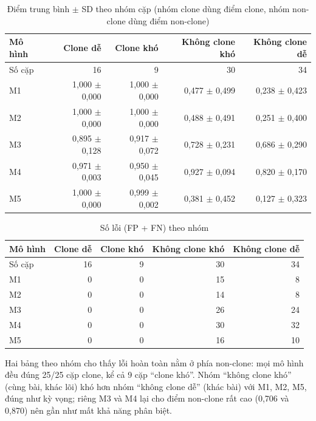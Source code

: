 \documentclass[11pt,a4paper]{article}
\begin{document}
\begin{table}[htbp]\centering\small
\caption{Điểm trung bình $\pm$ SD theo nhóm cặp (nhóm clone dùng điểm clone,
nhóm non-clone dùng điểm non-clone)}\label{tab:suite-cat-score}
\setlength{\tabcolsep}{4pt}
\begin{tabular}{lrrrr}
\toprule
Mô hình & Clone dễ & Clone khó & Không clone khó & Không clone dễ \\
\midrule
Số cặp & 16 & 9 & 30 & 34 \\
\midrule
M1 & 1,000 $\pm$ 0,000 & 1,000 $\pm$ 0,000 & 0,477 $\pm$ 0,499 & 0,238 $\pm$ 0,423 \\
M2 & 1,000 $\pm$ 0,000 & 1,000 $\pm$ 0,000 & 0,488 $\pm$ 0,491 & 0,251 $\pm$ 0,400 \\
M3 & 0,895 $\pm$ 0,128 & 0,917 $\pm$ 0,072 & 0,728 $\pm$ 0,231 & 0,686 $\pm$ 0,290 \\
M4 & 0,971 $\pm$ 0,003 & 0,950 $\pm$ 0,045 & 0,927 $\pm$ 0,094 & 0,820 $\pm$ 0,170 \\
M5 & 1,000 $\pm$ 0,000 & 0,999 $\pm$ 0,002 & 0,381 $\pm$ 0,452 & 0,127 $\pm$ 0,323 \\
\bottomrule
\end{tabular}
\end{table}

\begin{table}[htbp]\centering\small
\caption{Số lỗi (FP + FN) theo nhóm}\label{tab:suite-cat-err}
\setlength{\tabcolsep}{4pt}
\begin{tabular}{lrrrr}
\toprule
Mô hình & Clone dễ & Clone khó & Không clone khó & Không clone dễ \\
\midrule
Số cặp & 16 & 9 & 30 & 34 \\
\midrule
M1 & 0 & 0 & 15 & 8 \\
M2 & 0 & 0 & 14 & 8 \\
M3 & 0 & 0 & 26 & 24 \\
M4 & 0 & 0 & 30 & 32 \\
M5 & 0 & 0 & 16 & 10 \\
\bottomrule
\end{tabular}
\end{table}

Hai bảng theo nhóm cho thấy lỗi hoàn toàn nằm ở phía non-clone: mọi mô hình đều
đúng 25/25 cặp clone, kể cả 9 cặp ``clone khó''. Nhóm ``không clone khó'' (cùng
bài, khác lõi) khó hơn nhóm ``không clone dễ'' (khác bài) với M1, M2, M5, đúng
như kỳ vọng; riêng M3 và M4 lại cho điểm non-clone rất cao (0,706 và 0,870) nên
gần như mất khả năng phân biệt.
\end{document}
